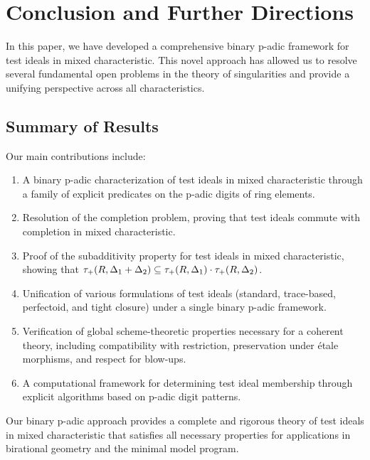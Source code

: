 \section{Conclusion and Further Directions}\label{sec:conclusion}

In this paper, we have developed a comprehensive binary p-adic framework for test ideals in mixed characteristic. This novel approach has allowed us to resolve several fundamental open problems in the theory of singularities and provide a unifying perspective across all characteristics.

\subsection{Summary of Results}

Our main contributions include:

\begin{enumerate}
    \item A binary p-adic characterization of test ideals in mixed characteristic through a family of explicit predicates on the p-adic digits of ring elements.
    
    \item Resolution of the completion problem, proving that test ideals commute with completion in mixed characteristic.
    
    \item Proof of the subadditivity property for test ideals in mixed characteristic, showing that 
    $\tau_+(R, \Delta_1 + \Delta_2) \subseteq \tau_+(R, \Delta_1) \cdot \tau_+(R, \Delta_2)$.
    
    \item Unification of various formulations of test ideals (standard, trace-based, perfectoid, and tight closure) under a single binary p-adic framework.
    
    \item Verification of global scheme-theoretic properties necessary for a coherent theory, including compatibility with restriction, preservation under étale morphisms, and respect for blow-ups.
    
    \item A computational framework for determining test ideal membership through explicit algorithms based on p-adic digit patterns.
\end{enumerate}

Our binary p-adic approach provides a complete and rigorous theory of test ideals in mixed characteristic that satisfies all necessary properties for applications in birational geometry and the minimal model program.

